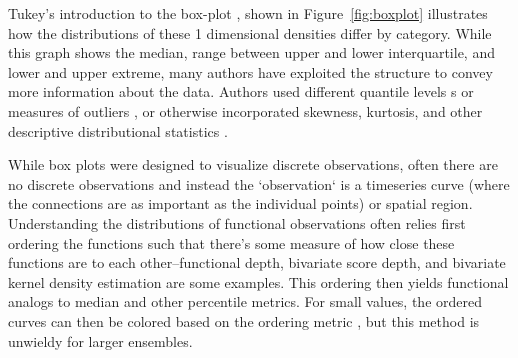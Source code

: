 \documentclass[../main.tex]{subfiles}
\begin{document}
Tukey's introduction to the box-plot \cite{tukey_exploratory_1977}, shown in
Figure~\ref{fig:boxplot} illustrates how the distributions of these 1 dimensional densities differ by category. While this graph shows the median, range between upper and lower interquartile, and lower and upper extreme, many authors have exploited the structure to convey more information about the data. Authors used different quantile levels \cite{hyndman_sample_1996}s or measures of outliers
\cite{frigge_implementations_1989, schwertman_identifying_2007}, or otherwise incorporated skewness, kurtosis, and other descriptive distributional statistics \cite{kim_more_2004, marmolejo-ramos_shifting_2015}.

While box plots were designed to visualize discrete observations, often there
are no discrete observations and instead the `observation` is a timeseries
curve (where the connections are as important as the individual points) or
spatial region. Understanding the distributions of functional observations
often relies first ordering the functions such that there's some measure of how close these functions are to each other--functional depth\cite{febrero_functional_2007},
bivariate score depth\cite{rob_j._hyndman_rainbow_2010}, and
bivariate kernel density estimation\cite{scott_multivariate_1992} are some examples. This
ordering then yields functional analogs to median and other percentile
metrics. For small values, the ordered curves can then be colored based on the
ordering metric \cite{rob_j._hyndman_rainbow_2010}, but this method is unwieldy for larger
ensembles.
\end{document}
